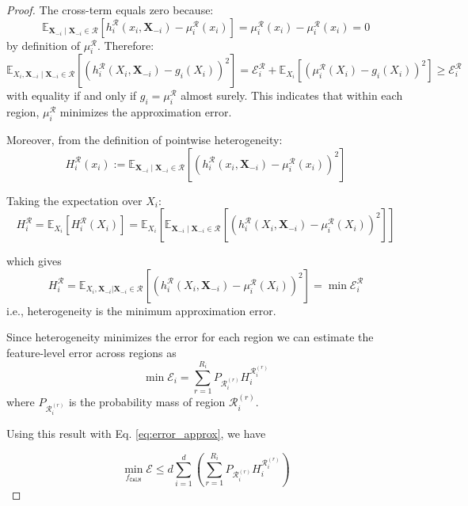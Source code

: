 \begin{proof}
The cross-term equals zero because:
\begin{equation*}
\mathbb{E}_{\mathbf{X}_{-i}\mid \mathbf{X}_{-i} \in \mathcal{R}}\left[h_i^{\mathcal{R}}(x_i, \mathbf{X}_{-i}) - \mu^{\mathcal{R}}_i(x_i)\right] = \mu^{\mathcal{R}}_i(x_i) - \mu^{\mathcal{R}}_i(x_i) = 0
\end{equation*}
by definition of $\mu^{\mathcal{R}}_i$. Therefore:
\begin{equation*}
\mathbb{E}_{X_i, \mathbf{X}_{-i}\mid \mathbf{X}_{-i} \in \mathcal{R}}\left[\left(h_i^{\mathcal{R}}(X_i, \mathbf{X}_{-i}) - g_i(X_i)\right)^2\right] = \mathcal{E}^{\mathcal{R}}_i + \mathbb{E}_{X_i}\left[\left(\mu^{\mathcal{R}}_i(X_i) - g_i(X_i)\right)^2\right] \geq \mathcal{E}^{\mathcal{R}}_i
\end{equation*}
with equality if and only if $g_i = \mu^{\mathcal{R}}_i$ almost surely. This indicates that within each region, $\mu_i^{\mathcal{R}}$ minimizes the approximation error.

Moreover, from the definition of pointwise heterogeneity:
\begin{equation*}
H^{\mathcal{R}}_i(x_i) := \mathbb{E}_{\mathbf{X}_{-i}\mid \mathbf{X}_{-i} \in \mathcal{R}}\left[\left(h_i^{\mathcal{R}}(x_i, \mathbf{X}_{-i}) - \mu^{\mathcal{R}}_i(x_i)\right)^2\right]
\end{equation*}

Taking the expectation over $X_i$:
\begin{equation*}
H^{\mathcal{R}}_i = \mathbb{E}_{X_i}\left[H^{\mathcal{R}}_i(X_i)\right] = \mathbb{E}_{X_i}\left[\mathbb{E}_{\mathbf{X}_{-i}\mid \mathbf{X}_{-i} \in \mathcal{R}}\left[\left(h_i^{\mathcal{R}}(X_i, \mathbf{X}_{-i}) - \mu^{\mathcal{R}}_i(X_i)\right)^2\right]\right]
\end{equation*}

which gives
\begin{equation*}
H^{\mathcal{R}}_i= \mathbb{E}_{X_i, \mathbf{X}_{-i}|\mathbf{X}_{-i} \in \mathcal{R}}\left[\left(h_i^{\mathcal{R}}(X_i, \mathbf{X}_{-i}) - \mu^{\mathcal{R}}_i(X_i)\right)^2\right] = \min\mathcal{E}_i^{\mathcal{R}}
\end{equation*}
i.e., heterogeneity is the minimum approximation error.

Since heterogeneity minimizes the error for each region we can estimate the feature-level error across regions as
\begin{equation*}
\min{\mathcal{E}_i} = \sum_{r=1}^{R_i}P_{\mathcal{R}_i^{(r)}}H^{\mathcal{R}_i^{(r)}}_i
\end{equation*}
where $P_{\mathcal{R}_i^{(r)}}$ is the probability mass of region $\mathcal{R}_i^{(r)}$.

Using this result with Eq. \eqref{eq:error_approx}, we have

\begin{equation*}
\min_{f_{\texttt{CALM}}} \mathcal{E} \leq d\sum_{i=1}^{d}\left(\sum_{r=1}^{R_i}P_{\mathcal{R}_i^{(r)}}H^{\mathcal{R}_i^{(r)}}_i\right)
\end{equation*}

\end{proof}

